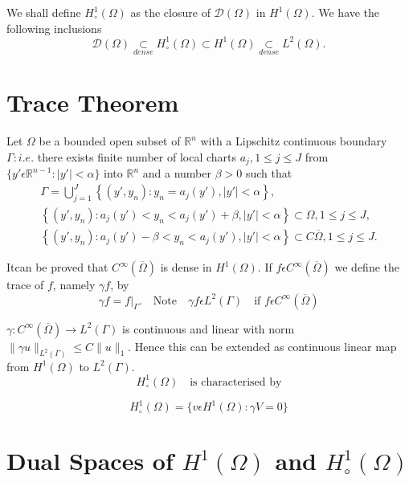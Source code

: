 We shall define $H_\circ^1(\Omega)$ as the closure of
$\mathscr{D}(\Omega)$ in $H^1(\Omega)$. We have the following
inclusions
$$
\mathscr{D}(\Omega) \underset{dense}{\subset} H_\circ^1(\Omega)\subset
H^1(\Omega)\underset{dense}{\subset} L^2(\Omega).
$$

\section{Trace Theorem}\label{chap1:subsec1.5} 
Let $\Omega$ be a bounded open subset of $\mathbb{R}^n$ with a Lipschitz
continuous boundary $\Gamma :i.e.$ there exists finite
number of local charts $a_j, 1\leq j\leq J$ from $\{y'
\epsilon \mathbb{R}^{n-1}:|y'|<\alpha\}$ into $\mathbb{R}^n$ and a
number $\beta > 0$ such that 
\begin{gather*}
\Gamma = \bigcup\limits_{j=1}^J \left\{(y', y_n):y_n = a_j(y'), |y'|<\alpha \right\},\\
\left\{(y', y_n):a_j(y')<y_n < a_j(y')+\beta, |y'|<\alpha\right\}\subset\Omega,
1 \leq j \leq J,\\
\left\{(y', y_n):a_j(y')-\beta < y_n <a_j(y'), |y'| < \alpha\right\} \subset C
\overline{\Omega},1\leq j\leq J.
\end{gather*}

It\pageoriginale can be proved that $C^\infty (\overline{\Omega})$ is dense
in $H^1(\Omega)$. If $f \epsilon C^\infty (\overline{\Omega})$ we
define the trace of $f$, namely $\gamma f$, by 
$$
\gamma f = f|_\Gamma. \quad \text{Note} \quad \gamma f \epsilon
L^2(\Gamma)\quad \text{if } f \epsilon
C^\infty(\overline{\Omega})
$$

$\gamma : C^\infty (\overline{\Omega})\to L^2(\Gamma)$ is continuous
and linear with norm $\parallel \gamma u\parallel_{L^2(\Gamma)}\leq
C\parallel u \parallel_1$. Hence this can be extended as continuous
linear map from $H^1(\Omega)$ to $L^2(\Gamma)$. 
$$
H_\circ^1(\Omega) \quad\text{is characterised by}
$$
\setcounter{THM}{1}
\begin{THM}\label{chap1:THM1}
$$
H_\circ^1(\Omega) = \{ v \epsilon H^1(\Omega):\gamma V=0\}
$$
\end{THM}

\section{Dual Spaces of $H^1(\Omega)$ and 
$H_\circ^1(\Omega)$}\label{chap1:subsec1.6} 

